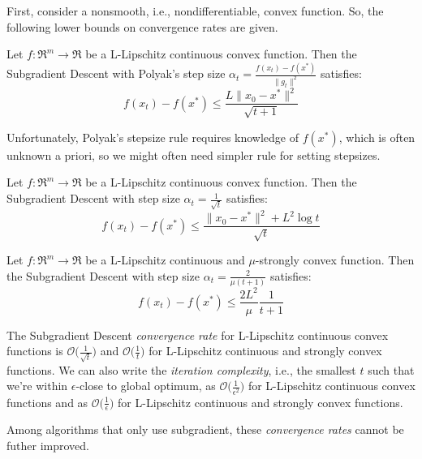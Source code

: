 First, consider a nonsmooth, i.e., nondifferentiable, convex function. So, the following lower bounds on convergence rates are given.

\begin{theorem} \label{thm:cvx_polyak_subgd_convergence}
Let $f: \Re^m \rightarrow \Re$ be a L-Lipschitz continuous convex function. Then the Subgradient Descent with Polyak's step size $\displaystyle \alpha_t = \frac{f(x_t) - f(x^*)}{\| g_t \|^2}$ satisfies:
$$
f(x_t) - f(x^*) \leq \frac{L \| x_0 - x^* \|^2}{\sqrt{t+1}}
$$
\end{theorem}

Unfortunately, Polyak’s stepsize rule requires knowledge of $f(x^*)$, which is often unknown a priori, so we might often need simpler rule for setting stepsizes.

\begin{theorem} \label{thm:cvx_subgd_convergence}
Let $f: \Re^m \rightarrow \Re$ be a L-Lipschitz continuous convex function. Then the Subgradient Descent with step size $\displaystyle \alpha_t = \frac{1}{\sqrt{t}}$ satisfies:
$$
f(x_t) - f(x^*) \leq \frac{\| x_0 - x^* \|^2 + L^2 \log t}{\sqrt{t}}
$$
\end{theorem}

\begin{theorem} \label{thm:str_cvx_subgd_convergence}
Let $f: \Re^m \rightarrow \Re$ be a L-Lipschitz continuous and $\mu$-strongly convex function. Then the Subgradient Descent with step size $\displaystyle \alpha_t = \frac{2}{\mu(t+1)}$ satisfies:
$$
f(x_t) - f(x^*) \leq \frac{2L^2}{\mu} \frac{1}{t+1}
$$
\end{theorem}

The Subgradient Descent \emph{convergence rate} for L-Lipschitz continuous convex functions is $\displaystyle \mathcal{O}\Bigg(\frac{1}{\sqrt{t}}\Bigg)$ and $\displaystyle \mathcal{O}\Bigg(\frac{1}{t}\Bigg)$ for L-Lipschitz continuous and strongly convex functions. We can also  write the \emph{iteration complexity}, i.e., the smallest $t$ such that we’re within $\epsilon$-close to global optimum, as $\displaystyle \mathcal{O}\Bigg(\frac{1}{\epsilon^2}\Bigg)$ for L-Lipschitz continuous convex functions and as $\displaystyle \mathcal{O}\Bigg(\frac{1}{\epsilon}\Bigg)$ for L-Lipschitz continuous and strongly convex functions.

Among algorithms that only use subgradient, these \emph{convergence rates} cannot be futher improved.

